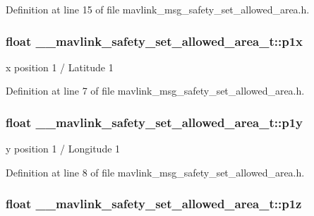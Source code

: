 Definition at line 15 of file mavlink\-\_\-msg\-\_\-safety\-\_\-set\-\_\-allowed\-\_\-area.\-h.

\hypertarget{struct____mavlink__safety__set__allowed__area__t_acf2cef0f070243c5e89a64f6f2ca413f}{
\subsubsection[{p1x}]{\setlength{\rightskip}{0pt plus 5cm}float \-\_\-\-\_\-mavlink\-\_\-safety\-\_\-set\-\_\-allowed\-\_\-area\-\_\-t\-::p1x}}\label{struct____mavlink__safety__set__allowed__area__t_acf2cef0f070243c5e89a64f6f2ca413f}


x position 1 / Latitude 1 



Definition at line 7 of file mavlink\-\_\-msg\-\_\-safety\-\_\-set\-\_\-allowed\-\_\-area.\-h.

\hypertarget{struct____mavlink__safety__set__allowed__area__t_a9cc53ebb50e264875c81df3671735dbe}{
\subsubsection[{p1y}]{\setlength{\rightskip}{0pt plus 5cm}float \-\_\-\-\_\-mavlink\-\_\-safety\-\_\-set\-\_\-allowed\-\_\-area\-\_\-t\-::p1y}}\label{struct____mavlink__safety__set__allowed__area__t_a9cc53ebb50e264875c81df3671735dbe}


y position 1 / Longitude 1 



Definition at line 8 of file mavlink\-\_\-msg\-\_\-safety\-\_\-set\-\_\-allowed\-\_\-area.\-h.

\hypertarget{struct____mavlink__safety__set__allowed__area__t_a290829bbd18c41b9d559d2c35850b919}{
\subsubsection[{p1z}]{\setlength{\rightskip}{0pt plus 5cm}float \-\_\-\-\_\-mavlink\-\_\-safety\-\_\-set\-\_\-allowed\-\_\-area\-\_\-t\-::p1z}}\label{struct____mavlink__safety__set__allowed__area__t_a290829bbd18c41b9d559d2c35850b919}


